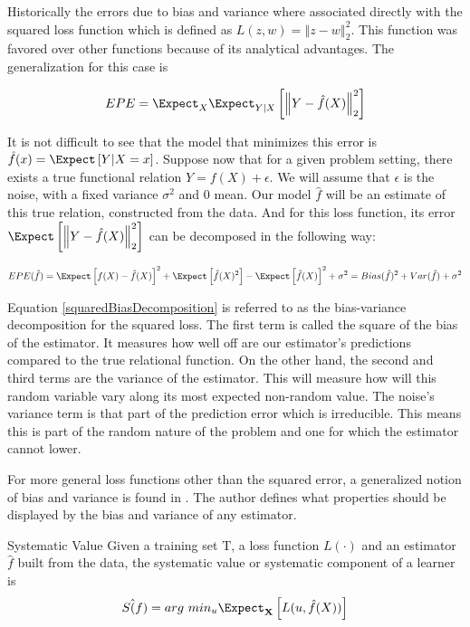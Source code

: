 Historically the errors due to bias and variance where associated directly with the squared loss function which is defined as $L(z,w) = \left\Vert z-w \right\Vert^2_2$. This function was favored over other functions because of its analytical advantages.  The generalization for this case is

\begin{equation}\label{squaredEPE}
EPE = \Expect_X \Expect_{Y|X} \left[ \left\Vert  Y - \hat{f}(X)  \right\Vert_2^2 \right]
\end{equation}

It is not difficult to see that the model that minimizes this error is $\hat{f}(x) = \Expect \left[ Y | X=x \right] $. Suppose now that for a given problem setting, there exists a true functional relation $Y = f(X) + \epsilon$. 
We will assume that $\epsilon$ is the noise, with a fixed variance $\sigma^2$ and $0$ mean. Our model $\hat{f}$ will be an estimate of this true relation, constructed from the data. And for this loss function, its error $\Expect \left[ \left\Vert Y  - \hat{f}(X) \right\Vert_2^2 \right]$ can be decomposed in the following way:

\begin{equation}\label{squaredBiasDecomposition}
EPE( \hat{f} ) = \Expect \left[   f(X)  - \hat{f}(X) \right]^2 +  \Expect \left[ \hat{f}(X)^2  \right] - \Expect \left[ \hat{f}(X)  \right]^2  + \sigma^2
= Bias(\hat{f})^2 + Var(\hat{f}) + \sigma^2
\end{equation}

Equation \ref{squaredBiasDecomposition} is referred to as the bias-variance decomposition for the squared loss. The first term is called the square of the bias of the estimator. It measures how well off are our estimator's predictions compared to the true relational function. On the other hand, the second and third terms are the variance of the estimator. This will measure how will this random variable vary along its most expected non-random value. The noise's variance term is that part of the prediction error which is irreducible. This means this is part of the random nature of the problem and one for which the estimator cannot lower.

For more general loss functions other than the squared error, a generalized notion of bias and variance is found in \cite{james-biasVarianceGeneral}. The author defines what properties should be displayed by the bias and variance of any estimator. 
\begin{definition}{Systematic Value}
	Given a training set $\mathrm{T}$, a loss function $L(\cdot)$ and an estimator $\hat{f}$ built from the data, the systematic value or systematic component of a learner is 
	$$ S\hat(f)  =  arg \ min_u \Expect_{\textbf{X}} \left[ L(u,\hat{f}(X)) \right]$$
\end{definition}

